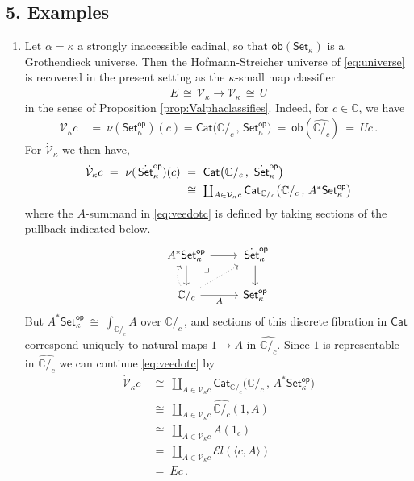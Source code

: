 \documentclass[11pt]{article}
\newcommand{\C}{\ensuremath{\mathbb{C}}}
\newcommand{\Set}{\ensuremath{\mathsf{Set}}}
\newcommand{\Cat}{\ensuremath{\mathsf{Cat}}}
\newcommand{\El}{\ensuremath{\mathcal{E}l}}%
\renewcommand{\to}{\ensuremath{\rightarrow}}
\newcommand{\too}{\ensuremath{\longrightarrow}}
\newcommand{\SSet}{\ensuremath{\,\dot{\Set}}}
\newcommand{\V}{\ensuremath{\mathcal{V}}}
\newcommand{\VV}{\ensuremath{\dot{\mathcal{V}}}}
\newcommand{\pbmark}{\ar[dr, phantom, "\lrcorner" very near start, shift right=.5ex]}	%
\theoremstyle{remark}
\theoremstyle{definition}
\begin{document}
\subsection*{5. Examples}

\begin{enumerate}
%
\item Let $\alpha = \kappa$ a strongly inaccessible cadinal, so that $\mathsf{ob}({\Set_\kappa})$ is a Grothendieck universe.  Then the Hofmann-Streicher universe of \eqref{eq:universe} is recovered in the present setting as the $\kappa$-small map classifier
\begin{equation*}
E\, \cong\, \VV_\kappa \too \V_\kappa\, \cong\, U
\end{equation*}
 in the sense of Proposition \ref{prop:Valphaclassifies}.  Indeed, for $c\in\C$, we have 
 \begin{align}
  \V_{\kappa}{c}\ &=\ \nu(\Set^{\mathsf{op}}_\kappa)(c) = \Cat\big( {\C/_c}\,,\, \Set^{\mathsf{op}}_\kappa \big)\  =\ \mathsf{ob}(\widehat{\C/_c})\ =\ U{c} \,.
   \end{align} 
For $\VV_{\kappa}$ we then have,
   \begin{align}\label{eq:veedotc}
   \VV_{\kappa}{c}\ =\ \nu(\SSet^{\mathsf{op}}_\kappa)(c)\ &=\ \Cat\big( {\C/_c}\,,\, \SSet^{\mathsf{op}}_\kappa \big) \notag \\ 
   &\cong\ {\textstyle \coprod_{A\in\V_{\kappa}{c}}\Cat_{{\C/_c}}\big( {\C/_c}\,,\, A^*\Set^{\mathsf{op}}_\kappa \big)}
   \end{align}
   where the $A$-summand in \eqref{eq:veedotc} is defined by taking sections of the  pullback indicated below.
   \begin{equation}\label{eq:pbforindexing}\textstyle
\begin{tikzcd}
	A^*\Set^{\mathsf{op}}_\kappa \ar[d] \ar[r] \pbmark & \SSet^{\mathsf{op}}_\kappa \ar[d]\\  
	\C/_c \ar[r,swap,"A"] \ar[u, bend left, dotted] \ar[ur, dotted] &  \Set^{\mathsf{op}}_\kappa
 \end{tikzcd}
 \end{equation}
 But $A^*\Set^{\mathsf{op}}_\kappa\ \cong\ {\textstyle \int_{\C/_c}\!A}$ over $\C/_c\,$, and sections of this discrete fibration in $\Cat$ correspond uniquely to natural maps $1\to A$ in $\widehat{{\C/_c}}$.  Since $1$  is representable in $\widehat{{\C/_c}}$ we can continue \eqref{eq:veedotc} by
  \begin{align*}
   \VV_{\kappa}{c}\ &\cong\ {\textstyle \coprod_{A\in \V_{\kappa}{c}}\Cat_{{\C/_c}}\big( {\C/_c}\,,\, A^*\Set^{\mathsf{op}}_\kappa \big)}\\
   	&\cong\ {\textstyle \coprod_{A\in \V_{\kappa}{c}} \widehat{{\C/_c}}(1, A)}\\
	&\cong\ {\textstyle \coprod_{A\in \V_{\kappa}{c}} A(1_c) } \\
	& =\ {\textstyle \coprod_{A\in \V_{\kappa}{c}} \El(\langle c, A\rangle)}\\
	& =\  E c\,.
   \end{align*}
 

\end{enumerate}
\end{document}
